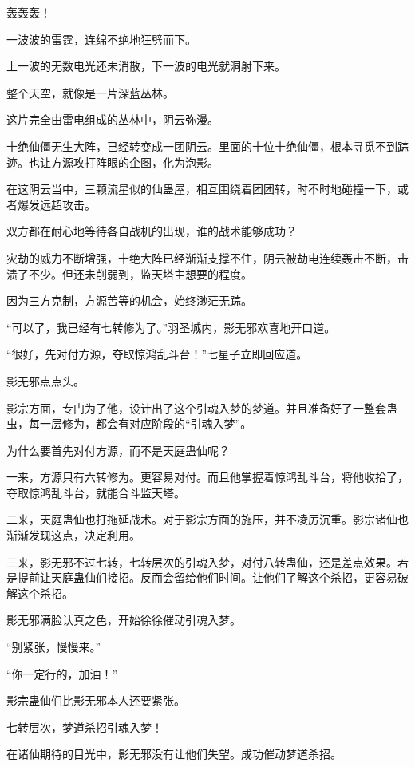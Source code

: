 
\begin{this_body}

轰轰轰！

一波波的雷霆，连绵不绝地狂劈而下。

上一波的无数电光还未消散，下一波的电光就洞射下来。

整个天空，就像是一片深蓝丛林。

这片完全由雷电组成的丛林中，阴云弥漫。

十绝仙僵无生大阵，已经转变成一团阴云。里面的十位十绝仙僵，根本寻觅不到踪迹。也让方源攻打阵眼的企图，化为泡影。

在这阴云当中，三颗流星似的仙蛊屋，相互围绕着团团转，时不时地碰撞一下，或者爆发远超攻击。

双方都在耐心地等待各自战机的出现，谁的战术能够成功？

灾劫的威力不断增强，十绝大阵已经渐渐支撑不住，阴云被劫电连续轰击不断，击溃了不少。但还未削弱到，监天塔主想要的程度。

因为三方克制，方源苦等的机会，始终渺茫无踪。

“可以了，我已经有七转修为了。”羽圣城内，影无邪欢喜地开口道。

“很好，先对付方源，夺取惊鸿乱斗台！”七星子立即回应道。

影无邪点点头。

影宗方面，专门为了他，设计出了这个引魂入梦的梦道。并且准备好了一整套蛊虫，每一层修为，都会有对应阶段的“引魂入梦”。

为什么要首先对付方源，而不是天庭蛊仙呢？

一来，方源只有六转修为。更容易对付。而且他掌握着惊鸿乱斗台，将他收拾了，夺取惊鸿乱斗台，就能合斗监天塔。

二来，天庭蛊仙也打拖延战术。对于影宗方面的施压，并不凌厉沉重。影宗诸仙也渐渐发现这点，决定利用。

三来，影无邪不过七转，七转层次的引魂入梦，对付八转蛊仙，还是差点效果。若是提前让天庭蛊仙们接招。反而会留给他们时间。让他们了解这个杀招，更容易破解这个杀招。

影无邪满脸认真之色，开始徐徐催动引魂入梦。

“别紧张，慢慢来。”

“你一定行的，加油！”

影宗蛊仙们比影无邪本人还要紧张。

七转层次，梦道杀招引魂入梦！

在诸仙期待的目光中，影无邪没有让他们失望。成功催动梦道杀招。


\end{this_body}
